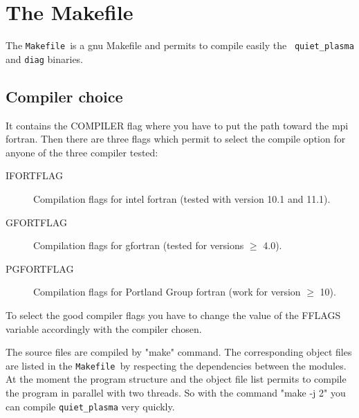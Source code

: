 \documentclass{article}
\newcommand{\mk}{{\tt Makefile\,}}
\begin{document}
\section{The Makefile}
The \mk is a gnu Makefile and permits to compile easily the {\tt
  quiet\_plasma} and {\tt diag} binaries.

\subsection{Compiler choice}
It contains the {\sf COMPILER} flag where you have to put the path
toward the mpi fortran.
Then there are three flags which permit to select the compile option
for anyone of the three compiler tested:
\begin{description}
\item[{\sf IFORTFLAG}] Compilation flags for intel fortran (tested
  with version 10.1 and 11.1).
\item[{\sf GFORTFLAG}] Compilation flags for gfortran (tested for
  versions $\ge$ 4.0).
\item[{\sf PGFORTFLAG}] Compilation flags for Portland Group fortran
  (work for version $\ge$ 10).
\end{description}
To select the good compiler flags you have to change the value of the
{\sf FFLAGS} variable accordingly with the compiler chosen.


The source files are compiled by "make" command. The corresponding
object files are listed in the \mk by respecting the dependencies between the modules.
At the moment the program structure and the object file list permits
to compile the program in parallel with two threads. So with the command
"make -j 2"  you can compile {\tt quiet\_plasma} very quickly.
\end{document}
